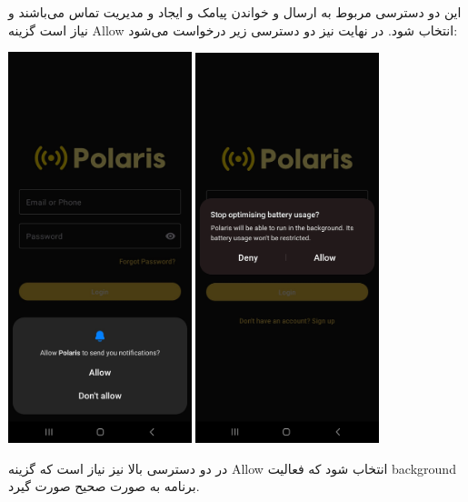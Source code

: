 \begin{itemize}
	
	این دو دسترسی مربوط به ارسال و خواندن پیامک و ایجاد و مدیریت تماس می‌باشند و نیاز است گزینه Allow انتخاب شود.
	در نهایت نیز دو دسترسی زیر درخواست می‌شود:
	\begin{center}
		\includegraphics[width=0.4\textwidth]{images/permission-notification.jpg}
		\includegraphics[width=0.4\textwidth]{images/permission-battery-optimization.jpg}
	\end{center}
	در دو دسترسی بالا نیز نیاز است که گزینه Allow انتخاب شود که فعالیت background برنامه به صورت صحیح صورت گیرد.

\end{itemize}
